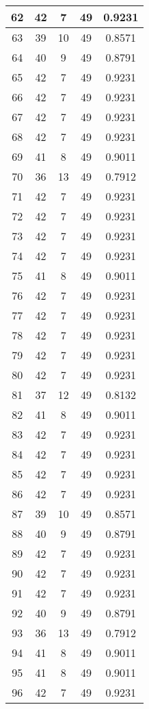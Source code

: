 \documentclass[letterpaper, 12pt]{article}
\begin{document}
\begin{longtable}{|c|c|c|c|c|}
\hline
62 & 42 & 7 & 49 & 0.9231 \\
\hline
63 & 39 & 10 & 49 & 0.8571 \\
\hline
64 & 40 & 9 & 49 & 0.8791 \\
\hline
65 & 42 & 7 & 49 & 0.9231 \\
\hline
66 & 42 & 7 & 49 & 0.9231 \\
\hline
67 & 42 & 7 & 49 & 0.9231 \\
\hline
68 & 42 & 7 & 49 & 0.9231 \\
\hline
69 & 41 & 8 & 49 & 0.9011 \\
\hline
70 & 36 & 13 & 49 & 0.7912 \\
\hline
71 & 42 & 7 & 49 & 0.9231 \\
\hline
72 & 42 & 7 & 49 & 0.9231 \\
\hline
73 & 42 & 7 & 49 & 0.9231 \\
\hline
74 & 42 & 7 & 49 & 0.9231 \\
\hline
75 & 41 & 8 & 49 & 0.9011 \\
\hline
76 & 42 & 7 & 49 & 0.9231 \\
\hline
77 & 42 & 7 & 49 & 0.9231 \\
\hline
78 & 42 & 7 & 49 & 0.9231 \\
\hline
79 & 42 & 7 & 49 & 0.9231 \\
\hline
80 & 42 & 7 & 49 & 0.9231 \\
\hline
81 & 37 & 12 & 49 & 0.8132 \\
\hline
82 & 41 & 8 & 49 & 0.9011 \\
\hline
83 & 42 & 7 & 49 & 0.9231 \\
\hline
84 & 42 & 7 & 49 & 0.9231 \\
\hline
85 & 42 & 7 & 49 & 0.9231 \\
\hline
86 & 42 & 7 & 49 & 0.9231 \\
\hline
87 & 39 & 10 & 49 & 0.8571 \\
\hline
88 & 40 & 9 & 49 & 0.8791 \\
\hline
89 & 42 & 7 & 49 & 0.9231 \\
\hline
90 & 42 & 7 & 49 & 0.9231 \\
\hline
91 & 42 & 7 & 49 & 0.9231 \\
\hline
92 & 40 & 9 & 49 & 0.8791 \\
\hline
93 & 36 & 13 & 49 & 0.7912 \\
\hline
94 & 41 & 8 & 49 & 0.9011 \\
\hline
95 & 41 & 8 & 49 & 0.9011 \\
\hline
96 & 42 & 7 & 49 & 0.9231 \\

\end{longtable}
\end{document}
